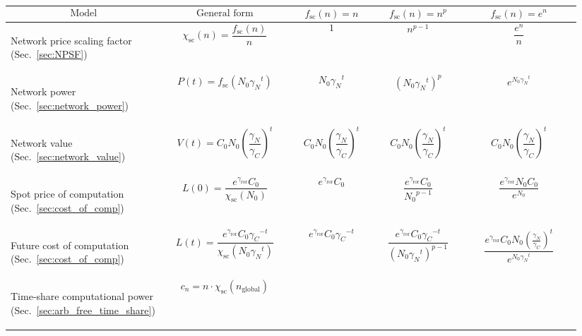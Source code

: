 \begin{table}[!htb]
\begin{tabular}{|m{0.21\linewidth}|m{0.22\linewidth}|m{0.155\linewidth}|m{0.155\linewidth}|m{0.2\linewidth}|}
	\hline
	\[\text{Model}\] & \[\text{General form}\] & \[f_\text{sc}(n)=n\] & \[f_\text{sc}(n)=n^p\] & \[f_\text{sc}(n)=e^n\]\\
	\hline \hline
	\begin{flushleft}Network price scaling factor (Sec.~\ref{sec:NPSF})\end{flushleft} & \[\chi_\text{sc}(n)=\frac{f_\text{sc}(n)}{n}\] & \[1\] & \[n^{p-1}\] & \[\frac{e^n}{n}\]\\
	\hline
	\begin{flushleft}Network power (Sec.~\ref{sec:network_power})\end{flushleft} & \[P(t)=f_\text{sc}(N_0{\gamma_N}^t)\] & \[N_0{\gamma_N}^t\] & \[\left(N_0{\gamma_N}^t\right)^p\] & \[ e^{N_0{\gamma_N}^t}\] \\
	\hline
	\begin{flushleft}Network value (Sec.~\ref{sec:network_value})\end{flushleft} & \[V(t)=C_0 N_0 \left(\frac{\gamma_N}{\gamma_C}\right)^t\] & \[C_0 N_0 \left(\frac{\gamma_N}{\gamma_C}\right)^t\] & \[C_0 N_0 \left(\frac{\gamma_N}{\gamma_C}\right)^t\] & \[C_0 N_0 \left(\frac{\gamma_N}{\gamma_C}\right)^t\] \\
	\hline
	\begin{flushleft}Spot price of computation (Sec.~\ref{sec:cost_of_comp})\end{flushleft} & \[L(0)=\frac{e^{\gamma_\text{ror}} C_0}{\chi_\text{sc}(N_0)}\] & \[e^{\gamma_\text{ror}} C_0\] &  \[\frac{e^{\gamma_\text{ror}}C_0}{{N_0}^{p-1}}\] & \[\frac{e^{\gamma_\text{ror}}N_0C_0}{e^{N_0}}\] \\
	\hline
	\begin{flushleft}Future cost of computation (Sec.~\ref{sec:cost_of_comp})\end{flushleft} & \[L(t)=\frac{e^{\gamma_\text{ror}} C_0{\gamma_C}^{-t}}{\chi_\text{sc}(N_0 {\gamma_N}^t)}
\] & \[e^{\gamma_\text{ror}} C_0{\gamma_C}^{-t} \] & \[ \frac{e^{\gamma_\text{ror}} C_0{\gamma_C}^{-t}}{(N_0 {\gamma_N}^t)^{p-1}}
\] & \[ \frac{e^{\gamma_\text{ror}} C_0N_0 \left(\frac{\gamma_N}{\gamma_C}\right)^t}{e^{N_0 {\gamma_N}^t}}\] \\
	\hline
	\begin{flushleft}Time-share computational power (Sec.~\ref{sec:arb_free_time_share})\end{flushleft} & \[c_n=n \cdot \chi_\text{sc}(n_\text{global})
\]
\end{tabular}
\end{table}
